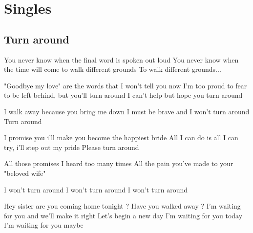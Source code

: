 \documentclass{article}
\newenvironment{album}[1]%
{%
  \section*{#1}
}%
{%
}
\newenvironment{song}[1]%
{%
  \subsection*{\textbf{#1}}
  \begin{multicols*}{2}
}%
{%
  \end{multicols*}
  \newpage
}
\newenvironment{couplet} %
{%
  \verbatim
}%
{% end code
  \endverbatim
}
\newenvironment{refrain} %
{%
  \verbatim
}%
{% end code
  \endverbatim
}
\newenvironment{pont} %
{%
  \verbatim
}%
{% end code
  \endverbatim
}
\begin{document}
\begin{album}{Singles}
\begin{song}{Turn around}
\begin{couplet}
You never know when the final word is spoken out loud
You never know when the time will come to walk different grounds
To walk different grounds...
\end{couplet}
\begin{couplet}
"Goodbye my love" are the words that I won't tell you now
I'm too proud to fear to be left behind, but you'll turn around
I can't help but hope you turn around
\end{couplet}
\begin{refrain}
I walk away because you bring me down
I must be brave and I won't turn around
Turn around
\end{refrain}
\begin{couplet}
I promise you i'll make you become the happiest bride
All I can do is all I can try, i'll step out my pride
Please turn around
\end{couplet}
\begin{refrain}
All those promises I heard too many times
All the pain you've made to your "beloved wife"
\end{refrain}
\begin{pont}
I won't turn around 
I won't turn around
I won't turn around 
\end{pont}
\begin{couplet}
Hey sister are you coming home tonight ?
Have you walked away ?
I'm waiting for you and we'll make it right
Let's begin a new day
I'm waiting for you today
I'm waiting for you maybe
\end{couplet}
\end{song}


\end{album}
\end{document}
